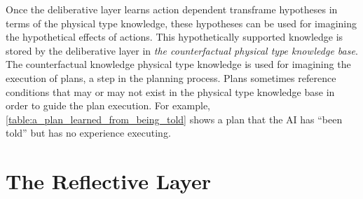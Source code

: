 Once the deliberative layer learns action dependent transframe
hypotheses in terms of the physical type knowledge, these hypotheses
can be used for imagining the hypothetical effects of actions.  This
hypothetically supported knowledge is stored by the deliberative layer
in \emph{the counterfactual physical type knowledge base}.  The
counterfactual knowledge physical type knowledge is used for imagining
the execution of plans, a step in the planning process.  Plans
sometimes reference conditions that may or may not exist in the
physical type knowledge base in order to guide the plan execution.
For example, {\mbox{\autoref{table:a_plan_learned_from_being_told}}}
shows a plan that the AI has ``been told'' but has no experience
executing.

\section{The Reflective Layer}


